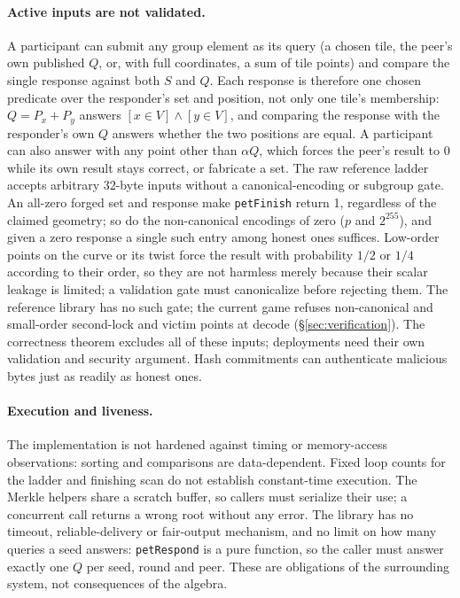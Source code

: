 \documentclass[11pt]{article}
\begin{document}
\paragraph{Active inputs are not validated.}
A participant can submit any group element as its query (a chosen tile, the
peer's own published $Q$, or, with full coordinates, a sum of tile points) and
compare the single response against both $S$ and $Q$. Each response is
therefore one chosen predicate over the responder's set and position, not
only one tile's membership: $Q=P_x+P_y$ answers $[x\in V]\wedge[y\in V]$,
and comparing the response with the responder's own $Q$ answers whether the
two positions are equal. A participant can also answer with any point other
than $\alpha Q$, which forces the peer's result to 0 while its own result
stays correct, or fabricate a set. The raw reference ladder accepts arbitrary
32-byte inputs without a canonical-encoding or subgroup gate. An all-zero
forged set and response make \texttt{petFinish} return 1, regardless of the
claimed geometry; so do the non-canonical encodings of zero ($p$ and
$2^{255}$), and given a zero response a single such entry among honest ones
suffices. Low-order
points on the curve or its twist force the result with probability $1/2$ or
$1/4$ according to their order, so they are not harmless merely because
their scalar leakage is limited; a validation gate must canonicalize before
rejecting them. The reference library has no such gate; the current game
refuses non-canonical and small-order second-lock and victim points at decode
(\S\ref{sec:verification}). The correctness theorem excludes all of these
inputs; deployments need their own validation and security argument. Hash
commitments can authenticate malicious bytes just as readily as honest ones.

\paragraph{Execution and liveness.}
The implementation is not hardened against timing or memory-access
observations: sorting and comparisons are data-dependent. Fixed loop counts
for the ladder and finishing scan do not establish constant-time execution.
The Merkle helpers share a scratch buffer, so callers must serialize their
use; a concurrent call returns a wrong root without any error. The library has
no timeout, reliable-delivery or fair-output mechanism, and no limit on how
many queries a seed answers: \texttt{petRespond} is a pure function, so the
caller must answer exactly one $Q$ per seed, round and peer. These are
obligations of the surrounding system, not consequences of the algebra.
\end{document}
